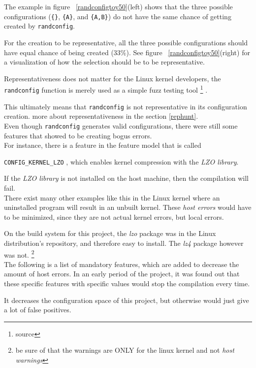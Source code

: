 \documentclass[a4paper,11pt]{report}
\newcommand{\textcode}[1]{
    \fboxsep=1pt
    \texttt{\colorbox{gray!20}{#1}}
}
\begin{document}
The example in figure ~\ref{randconfigtoy50}(left) shows that the three possible
configurations (\texttt{\{\}}, \texttt{\{A\}}, and \texttt{\{A,B\}}) do 
not have the same chance of getting created by \texttt{randconfig}.

For the creation to be representative, all the three possible configurations 
should have equal chance of being created (33\%). See figure 
~\ref{randconfigtoy50}(right) for a visualization of how the selection should 
be to be representative.


Representativeness does not matter for the Linux kernel developers, the 
\texttt{randconfig} function is merely used as a simple fuzz testing tool
    \footnote{source}
.

This ultimately means that \texttt{randconfig} is not representative in its 
configuration creation. more about representativeness in the section 
\ref{rephunt}.
\\

Even though \texttt{randconfig} generates valid configurations, there were still
some features that showed to be creating bogus errors.
\\

For instance, there is a feature in the feature model that is called 
\textcode{CONFIG\_KERNEL\_LZO}, which enables kernel compression with the 
\emph{LZO library}.

If the \emph{LZO library} is not installed on the host machine, then the 
compilation will fail.
\\

There exist many other examples like this in the Linux kernel where an 
uninstalled program will result in an unbuilt kernel. These \emph{host 
errors} would have to be minimized, since they are not actual kernel errors, 
but local errors. 

On the build system for this project, the \emph{lzo} package was in the Linux 
distribution's repository, and therefore easy to install. The \emph{lz4} 
package however was not.
    \footnote{be sure of that the warnings are ONLY for the linux kernel and
        not \emph{host warnings}}
\\

The following is a list of mandatory features, which are added to decrease the 
amount of host errors. In an early period of the project, it was found out that 
these specific features with specific values would stop the compilation every 
time.

It decreases the configuration space of this project, but otherwise 
would just give a lot of false positives.
\\
\end{document}
